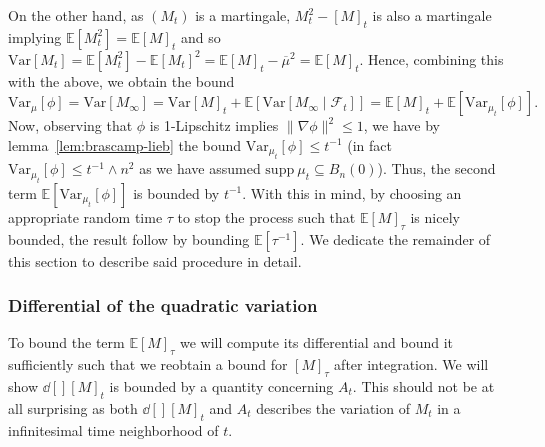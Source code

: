 On the other hand, as \((M_t)\) is a martingale, \(M_t^2 - [M]_t\) is also a martingale implying
\(\mathbb{E}[M_t^2] = \mathbb{E}[M]_t\) and so \(\text{Var}[M_t] = \mathbb{E}[M_t^2] - \mathbb{E}[M_t]^2 
  = \mathbb{E}[M]_t - \overline{\mu}^2 = \mathbb{E}[M]_t\). Hence, combining this with the above, we obtain 
the bound
\begin{equation}\label{eq:bound}
  \text{Var}_\mu[\phi] = \text{Var}[M_\infty] = \text{Var}[M]_t + \mathbb{E}[\text{Var}[M_\infty \mid \mathscr{F}_t]] 
    = \mathbb{E}[M]_t + \mathbb{E}[\text{Var}_{\mu_t}[\phi]].
\end{equation}
Now, observing that \(\phi\) is 1-Lipschitz implies \(\|\nabla \phi\|^2 \le 1\), we have by lemma~\ref{lem:brascamp-lieb} 
the bound \(\text{Var}_{\mu_t}[\phi] \le t^{-1}\) (in fact \(\text{Var}_{\mu_t}[\phi] \le t^{-1} \wedge n^2\) as 
we have assumed \(\text{supp}\ \mu_t \subseteq B_n(0)\)). Thus, the second term \(\mathbb{E}[\text{Var}_{\mu_t}[\phi]]\) 
is bounded by \(t^{-1}\). With this in mind, by choosing an appropriate random time \(\tau\) to stop the process such that 
\(\mathbb{E}[M]_\tau\) is nicely bounded, the result follow by bounding \(\mathbb{E}[\tau^{-1}]\). We dedicate 
the remainder of this section to describe said procedure in detail.

\subsubsection{Differential of the quadratic variation}

To bound the term \(\mathbb{E}[M]_\tau\) we will compute its differential and bound it 
sufficiently such that we reobtain a bound for \([M]_\tau\) after integration. 
We will show \(\dd[] [M]_t\) is bounded by a quantity concerning \(A_t\). This should not be at all 
surprising as both \(\dd[] [M]_t\) and \(A_t\) describes the variation of \(M_t\) in a infinitesimal time 
neighborhood of \(t\).

